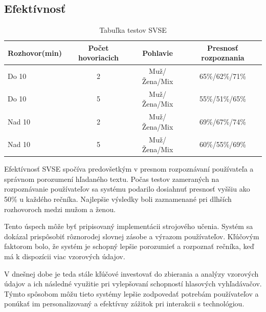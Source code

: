 \documentclass[10pt,slovak,a4paper]{article}
\begin{document}
\begin{enumerate}
\section{Efektívnosť} 
\begin{table}[h]
    \centering
    \begin{center}
        \begin{tabular}{lccc}
            \toprule
            \textbf{Rozhovor(min)} & \textbf{Počet hovoriacich} & \textbf{Pohlavie} & \textbf{Presnosť rozpoznania} \\
            \midrule
            Do 10 & 2 & Muž/Žena/Mix & 65\%/62\%/71\% \\
            Do 10 & 5 & Muž/Žena/Mix & 55\%/51\%/65\% \\
            Nad 10 & 2 & Muž/Žena/Mix & 69\%/67\%/74\% \\
            Nad 10 & 5 & Muž/Žena/Mix & 60\%/55\%/69\% \\
            \bottomrule
        \end{tabular}
    \end{center}
    \caption{Tabuľka testov SVSE}
    \label{tab:mytable}
    \cite{sarhan2014smart}
\end{table}

\leavevmode \newline
Efektívnosť SVSE spočíva predovšetkým v presnom rozpoznávaní používateľa a správnom porozumení hľadaného textu. Počas testov zameraných na rozpoznávanie používateľov sa systému podarilo dosiahnuť presnosť vyššiu ako 50\% u každého rečníka. Najlepšie výsledky boli zaznamenané pri dlhších rozhovoroch medzi mužom a ženou.

Tento úspech môže byť pripisovaný implementácii strojového učenia. Systém sa dokázal prispôsobiť rôznorodej slovnej zásobe a výrazom používateľov. Kľúčovým faktorom bolo, že systém je schopný lepšie porozumieť a rozpoznať rečníka, keď má k dispozícii viac vzorových údajov. 

V dnešnej dobe je teda stále kľúčové investovať do zbierania a analýzy vzorových údajov a ich následné využitie pri vylepšovaní schopností hlasových vyhľadávačov. Týmto spôsobom môžu tieto systémy lepšie zodpovedať potrebám používateľov a ponúkať im personalizovaný a efektívny zážitok pri interakcii s technológiou.
\cite{masterofcode-voice-assistants}


\end{enumerate}
\end{document}
